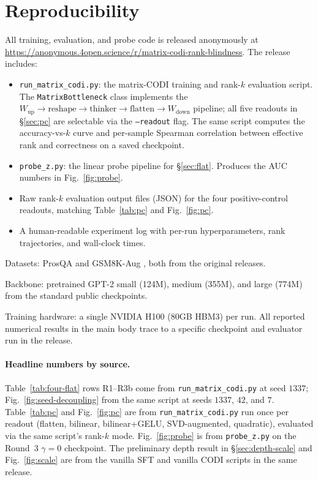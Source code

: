 \section{Reproducibility}
\label{sec:repro}

All training, evaluation, and probe code is released anonymously
at \url{https://anonymous.4open.science/r/matrix-codi-rank-blindness}.
The release includes:

\begin{itemize}
\setlength\itemsep{2pt}
\item \texttt{run\_matrix\_codi.py}: the matrix-CODI training
      and rank-$k$ evaluation script. The
      \texttt{MatrixBottleneck} class implements the
      $W_{\text{up}}\!\to\!\text{reshape}\!\to\!\text{thinker}\!\to\!\text{flatten}\!\to\!W_{\text{down}}$
      pipeline; all five readouts in \S\ref{sec:pc} are selectable
      via the \texttt{--readout} flag. The same script computes the
      accuracy-vs-$k$ curve and per-sample Spearman correlation
      between effective rank and correctness on a saved checkpoint.
\item \texttt{probe\_z.py}: the linear probe pipeline for
      \S\ref{sec:flat}. Produces the AUC numbers in
      Fig.~\ref{fig:probe}.
\item Raw rank-$k$ evaluation output files (JSON) for the four
      positive-control readouts, matching Table~\ref{tab:pc} and
      Fig.~\ref{fig:pc}.
\item A human-readable experiment log with per-run hyperparameters,
      rank trajectories, and wall-clock times.
\end{itemize}

Datasets: ProsQA \citep{hao2024coconut} and GSM8K-Aug
\citep{shen2025codi}, both from the original releases.

Backbone: pretrained GPT-2 small (124M), medium (355M), and large
(774M) from the standard public checkpoints.

Training hardware: a single NVIDIA H100 (80GB HBM3) per run. All
reported numerical results in the main body trace to a specific
checkpoint and evaluator run in the release.

\paragraph{Headline numbers by source.} Table~\ref{tab:four-flat}
rows R1--R3b come from \texttt{run\_matrix\_codi.py} at seed
$1337$; Fig.~\ref{fig:seed-decoupling} from the same script at
seeds $1337$, $42$, and $7$. Table~\ref{tab:pc} and
Fig.~\ref{fig:pc} are from \texttt{run\_matrix\_codi.py} run once
per readout (flatten, bilinear, bilinear+GELU, SVD-augmented,
quadratic), evaluated via the same script's rank-$k$ mode.
Fig.~\ref{fig:probe} is from \texttt{probe\_z.py} on the Round~3
$\gamma\!=\!0$ checkpoint. The preliminary depth result in
\S\ref{sec:depth-scale} and Fig.~\ref{fig:scale} are from the
vanilla SFT and vanilla CODI scripts in the same release.
